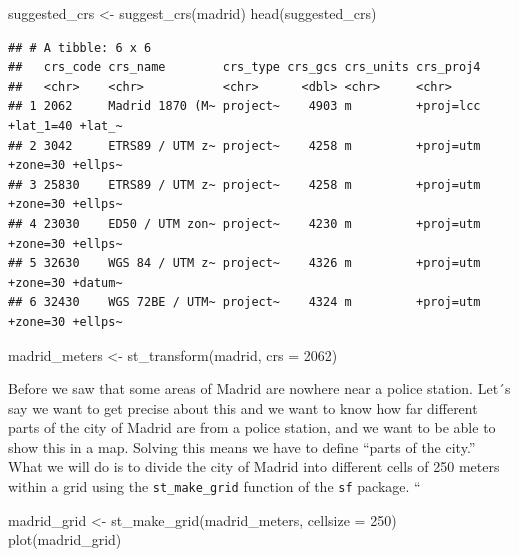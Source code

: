 \documentclass[
]{book}
\makeatletter
\newenvironment{Shaded}{\begin{snugshade}}{\end{snugshade}}
\newcommand{\AttributeTok}[1]{\textcolor[rgb]{0.61,0.61,0.61}{#1}}
\newcommand{\DecValTok}[1]{\textcolor[rgb]{0.06,0.06,0.06}{#1}}
\newcommand{\FunctionTok}[1]{\textcolor[rgb]{0,0,0}{#1}}
\newcommand{\NormalTok}[1]{#1}
\newcommand{\OtherTok}[1]{\textcolor[rgb]{0.37,0.37,0.37}{#1}}
\newenvironment{kframe}{%
\medskip{}
\setlength{\fboxsep}{.8em}
 \def\at@end@of@kframe{}%
 \ifinner\ifhmode%
  \def\at@end@of@kframe{\end{minipage}}%
  \begin{minipage}{\columnwidth}%
 \fi\fi%
 \def\FrameCommand##1{\hskip\@totalleftmargin \hskip-\fboxsep
 \colorbox{shadecolor}{##1}\hskip-\fboxsep
     \hskip-\linewidth \hskip-\@totalleftmargin \hskip\columnwidth}%
 \MakeFramed {\advance\hsize-\width
   \@totalleftmargin\z@ \linewidth\hsize
   \@setminipage}}%
 {\par\unskip\endMakeFramed%
 \at@end@of@kframe}
\renewenvironment{Shaded}{\begin{kframe}}{\end{kframe}}
\makeatother
\begin{document}
\begin{Shaded}
\begin{Highlighting}[]
\NormalTok{suggested\_crs }\OtherTok{\textless{}{-}} \FunctionTok{suggest\_crs}\NormalTok{(madrid)}
\FunctionTok{head}\NormalTok{(suggested\_crs)}
\end{Highlighting}
\end{Shaded}

\begin{verbatim}
## # A tibble: 6 x 6
##   crs_code crs_name        crs_type crs_gcs crs_units crs_proj4                 
##   <chr>    <chr>           <chr>      <dbl> <chr>     <chr>                     
## 1 2062     Madrid 1870 (M~ project~    4903 m         +proj=lcc +lat_1=40 +lat_~
## 2 3042     ETRS89 / UTM z~ project~    4258 m         +proj=utm +zone=30 +ellps~
## 3 25830    ETRS89 / UTM z~ project~    4258 m         +proj=utm +zone=30 +ellps~
## 4 23030    ED50 / UTM zon~ project~    4230 m         +proj=utm +zone=30 +ellps~
## 5 32630    WGS 84 / UTM z~ project~    4326 m         +proj=utm +zone=30 +datum~
## 6 32430    WGS 72BE / UTM~ project~    4324 m         +proj=utm +zone=30 +ellps~
\end{verbatim}

\begin{Shaded}
\begin{Highlighting}[]
\NormalTok{madrid\_meters }\OtherTok{\textless{}{-}} \FunctionTok{st\_transform}\NormalTok{(madrid, }\AttributeTok{crs =} \DecValTok{2062}\NormalTok{)}
\end{Highlighting}
\end{Shaded}

Before we saw that some areas of Madrid are nowhere near a police station. Let´s say we want to get precise about this and we want to know how far different parts of the city of Madrid are from a police station, and we want to be able to show this in a map. Solving this means we have to define ``parts of the city.'' What we will do is to divide the city of Madrid into different cells of 250 meters within a grid using the \texttt{st\_make\_grid} function of the \texttt{sf} package.
``

\begin{Shaded}
\begin{Highlighting}[]
\NormalTok{madrid\_grid }\OtherTok{\textless{}{-}} \FunctionTok{st\_make\_grid}\NormalTok{(madrid\_meters,  }\AttributeTok{cellsize =} \DecValTok{250}\NormalTok{)}
\FunctionTok{plot}\NormalTok{(madrid\_grid)}
\end{Highlighting}
\end{Shaded}
\end{document}
